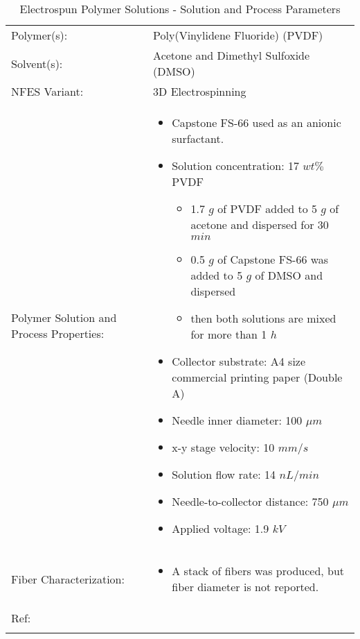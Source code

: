 \begin{table}[th]
\caption{Electrospun Polymer Solutions - Solution and Process Parameters}
\begin{center}
\begin{tabular}{
>{\raggedright\arraybackslash}p{}
>{\raggedright\arraybackslash}p{} }

\hline
Polymer(s): &
Poly(Vinylidene Fluoride) (PVDF) \\

\arrayrulecolor{lightgray}\hline
Solvent(s): &
Acetone and Dimethyl Sulfoxide (DMSO) \\

\hline
NFES Variant: &
3D Electrospinning \\

\hline
Polymer Solution and Process Properties: &
\begin{itemize}[leftmargin=*]
\item Capstone FS-66 used as an anionic surfactant.
\item Solution concentration: 17 $w t \%$ PVDF
    \begin{itemize}[leftmargin=*]
    \item 1.7 $g$ of PVDF added to 5 $g$ of acetone and dispersed for 30 $min$
    \item 0.5 $g$ of Capstone FS-66 was added to 5 $g$ of DMSO and dispersed
    \item then both solutions are mixed for more than 1 $h$
    \end{itemize}
\item Collector substrate: A4 size commercial printing paper (Double A)
\item Needle inner diameter: 100 $\mu m$
\item x-y stage velocity: 10 $m m / s$
\item Solution flow rate: 14 $n L / min$
\item Needle-to-collector distance: 750 $\mu m$
\item Applied voltage: 1.9 $k V$
\end{itemize} \\

\hline
Fiber Characterization: &
\begin{itemize}[leftmargin=*]
\item A stack of fibers was produced, but fiber diameter is not reported.
\end{itemize} \\

\hline
Ref: & \cite{Kim2018} \\ %
\arrayrulecolor{black}\hline
\label{tbl:FloresCompare}
\end{tabular}
\end{center}
\end{table}

